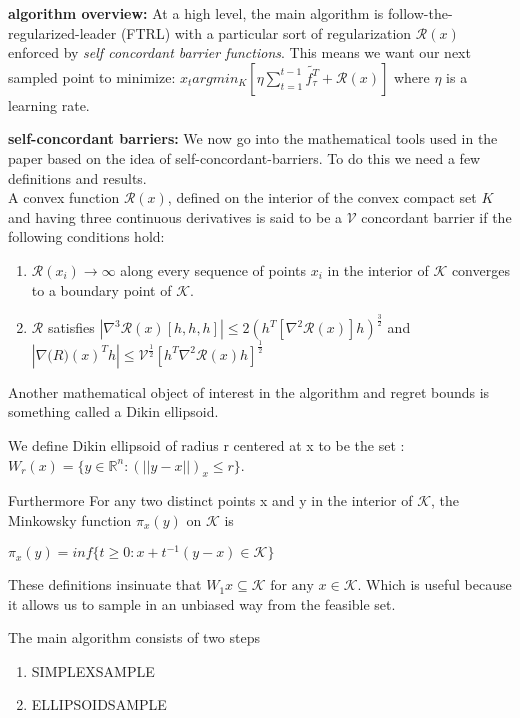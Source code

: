 \textbf{algorithm overview:}
At a high level, the main algorithm is follow-the-regularized-leader (FTRL) with a particular
sort of regularization  $\mathcal{R}(x)$ enforced by \textit{self concordant barrier functions}. This means we want our next sampled point 
to minimize:  $x_t  argmin_{K}[\eta \sum_{t=1}^{t-1} \tilde{f_{\tau}^T} + \mathcal{R}(x)]$ where $\eta$ is a learning rate. 

\textbf{self-concordant barriers:}
We now go into the mathematical tools used in the paper based on the idea of self-concordant-barriers. To do this we need a few definitions and results.\\

A convex function $\mathcal{R}(x)$,  defined on the interior of the convex compact set $K$ and having three continuous derivatives is said to be a $\mathcal{V}$ concordant barrier if the following 
conditions hold:

\begin{enumerate}
\item
  $\mathcal{R}(x_i) \rightarrow \infty$ along every sequence of points $x_i$ in the interior of $\mathcal{K}$ converges to a boundary point of $\mathcal{K}$.

\item
$\mathcal{R}$ satisfies $|\nabla^3 \mathcal{R}(x) [h, h, h]| \leq 2(h^T [\nabla^2 \mathcal{R}(x)]h)^{\frac{3}{2}}$ and $|\nabla \mathcal(R)(x)^T h| \leq \mathcal{V}^{\frac{1}{2}}[h^T \nabla^2 \mathcal{R}(x) h]^\frac{1}{2}$

\end{enumerate}

Another mathematical object of interest in the algorithm
and regret bounds is something called a Dikin ellipsoid.

We define Dikin ellipsoid of radius r centered at x to be the set :
$W_r(x) = \{ y \in  \mathbb{R}^n : (||y - x||)_x \leq r \}$.

Furthermore For any two distinct points x and y in the interior of $\mathcal{K}$,   the Minkowsky
function $\pi_x(y)$ on $\mathcal{K}$ is 

$\pi_x(y) = inf \{t \geq 0 : x + t^{-1}(y - x) \in \mathcal{K} \}$

These definitions insinuate that $W_1{x} \subseteq \mathcal{K} \text{ for any } x \in \mathcal{K}$. Which 
is useful because it allows us  to sample in an unbiased way from the feasible set.

The main algorithm consists of two steps 
\begin{enumerate}
\item
  SIMPLEXSAMPLE
\item
  ELLIPSOIDSAMPLE
\end{enumerate}

